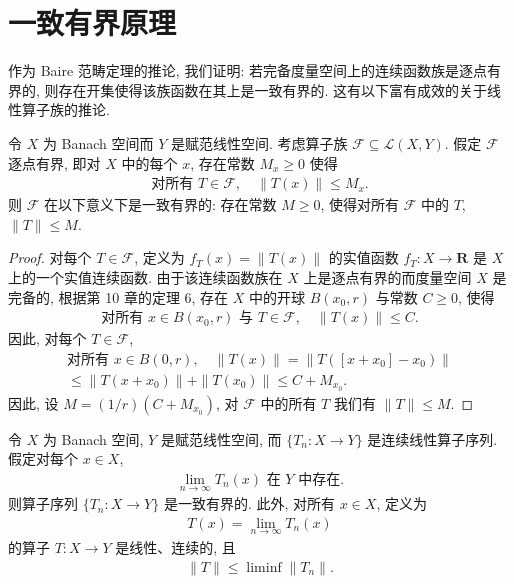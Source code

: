 \documentclass[../../main.tex]{subfiles}
\begin{document}
\section{一致有界原理}\label{section:ch13-一致有界}

作为 Baire 范畴定理的推论, 我们证明: 若完备度量空间上的连续函数族是逐点有界的, 则存在开集使得该族函数在其上是一致有界的. 这有以下富有成效的关于线性算子族的推论.

\begin{theorem}[一致有界原理]\label{theorem:ch13-一致有界}
令 $X$ 为 Banach 空间而 $Y$ 是赋范线性空间. 考虑算子族 $\mathcal{F}\subseteq\mathcal{L}(X,Y)$. 假定 $\mathcal{F}$ 逐点有界, 即对 $X$ 中的每个 $x$, 存在常数 $M_{x}\geqslant 0$ 使得
\begin{align*}
\text{对所有 }T\in\mathcal{F},\quad\|T(x)\|\leqslant M_{x}.
\end{align*}
则 $\mathcal{F}$ 在以下意义下是一致有界的: 存在常数 $M\geqslant 0$, 使得对所有 $\mathcal{F}$ 中的 $T$, $\|T\|\leqslant M$.
\end{theorem}

\begin{proof}
对每个 $T\in\mathcal{F}$, 定义为 $f_{T}(x)=\|T(x)\|$ 的实值函数 $f_{T}:X\to\mathbf{R}$ 是 $X$ 上的一个实值连续函数. 由于该连续函数族在 $X$ 上是逐点有界的而度量空间 $X$ 是完备的, 根据第 10 章的定理 6, 存在 $X$ 中的开球 $B(x_{0},r)$ 与常数 $C\geqslant 0$, 使得
\begin{align*}
\text{对所有 }x\in B(x_{0},r)\text{ 与 }T\in\mathcal{F},\quad\|T(x)\|\leqslant C.
\end{align*}
因此, 对每个 $T\in\mathcal{F}$,
\begin{align*}
\text{对所有 }x\in B(0,r),\quad\|T(x)\|=\|T([x+x_{0}]-x_{0})\|\\
\leqslant\|T(x+x_{0})\|+\|T(x_{0})\|\leqslant C+M_{x_{0}}.
\end{align*}
因此, 设 $M=(1/r)(C+M_{x_{0}})$, 对 $\mathcal{F}$ 中的所有 $T$ 我们有 $\|T\|\leqslant M$.
\end{proof}

\begin{theorem}\label{theorem:ch13-Banach-Steinhaus}
令 $X$ 为 Banach 空间, $Y$ 是赋范线性空间, 而 $\{T_{n}:X\to Y\}$ 是连续线性算子序列. 假定对每个 $x\in X$,
\begin{align}
\lim_{n\to\infty}T_{n}(x)\text{ 在 }Y\text{ 中存在}.\label{align:ch13-逐点极限存在}
\end{align}
则算子序列 $\{T_{n}:X\to Y\}$ 是一致有界的. 此外, 对所有 $x\in X$, 定义为
\begin{align*}
T(x)=\lim_{n\to\infty}T_{n}(x)
\end{align*}
的算子 $T:X\to Y$ 是线性、连续的, 且
\begin{align*}
\|T\|\leqslant\liminf\|T_{n}\|.
\end{align*}
\end{theorem}
\end{document}
